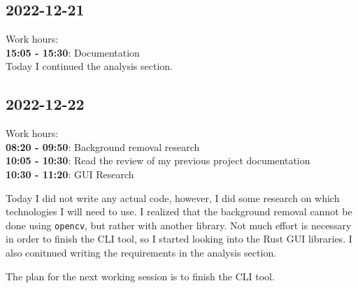 \documentclass{article}
\begin{document}
\subsection{2022-12-21}

Work hours:\\
\textbf{15:05 - 15:30}: Documentation \\

Today I continued the analysis section.

\subsection{2022-12-22}

Work hours:\\
\textbf{08:20 - 09:50}: Background removal research \\
\textbf{10:05 - 10:30}: Read the review of my previous project documentation \\
\textbf{10:30 - 11:20}: GUI Research

Today I did not write any actual code, however, I did some research on which
technologies I will need to use. I realized that the background removal
cannot be done using \texttt{opencv}, but rather with another library.
Not much effort is necessary in order to finish the CLI tool, so I started
looking into the Rust GUI libraries. I also conitnued writing the requirements
in the analysis section.

The plan for the next working session is to finish the CLI tool.
\end{document}
